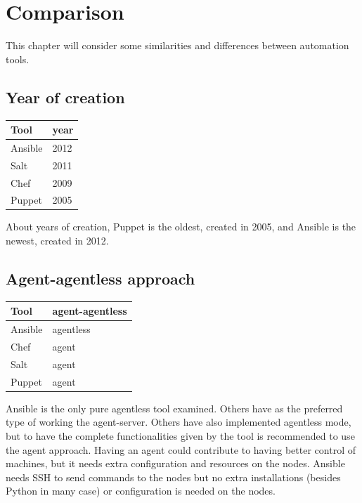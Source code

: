 \documentclass[12pt,a4paper,openright,twoside]{book}
\begin{document}
\section{Comparison}
This chapter will consider some similarities and differences between automation tools.

\subsection{Year of creation}
\begin{table}[H]
    \begin{tabular}{|l|l|}
    \hline
    \textbf{Tool} & \textbf{year} \\ \hline
    Ansible       & 2012                   \\ \hline 
    Salt          & 2011                   \\ \hline
    Chef          & 2009                   \\ \hline
    Puppet        & 2005                   \\ \hline
    \end{tabular}
\end{table}
About years of creation, Puppet is the oldest, created in 2005, and Ansible is the newest, created in 2012.

\subsection{Agent-agentless approach}
\begin{table}[H]
    \begin{tabular}{|l|l|}
    \hline
    \textbf{Tool} & \textbf{agent-agentless} \\ \hline
    Ansible       & agentless                \\ \hline
    Chef          & agent                    \\ \hline
    Salt          & agent                    \\ \hline
    Puppet        & agent                    \\ \hline
    \end{tabular}
\end{table}
Ansible is the only pure agentless tool examined. Others have as the preferred type of working the agent-server.
Others have also implemented agentless mode, but to have the complete functionalities given by the tool is recommended to use the agent approach.
Having an agent could contribute to having better control of machines, but it needs extra configuration and resources on the nodes.
Ansible needs SSH to send commands to the nodes but no extra installations (besides Python in many case) or configuration is needed on the nodes.
\end{document}
